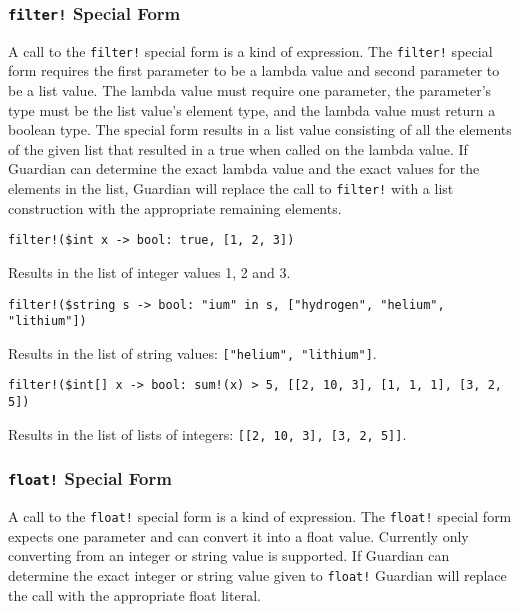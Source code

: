 {	\subsubsection{\texttt{filter!} Special Form}
	{
		A call to the \texttt{filter!} special form is a kind of expression.
		The \texttt{filter!} special form requires the first parameter to be
		a lambda value and second parameter to be a list value.
		The lambda value must require one parameter, the parameter's type must
		be the list value's element type, and the lambda value must return a
		boolean type.
		The special form results in a list value consisting of all the elements
		of the given list that resulted in a true when called on the lambda
		value.
		If Guardian can determine the exact lambda value and the exact
		values for the elements in the list, Guardian will replace the call
		to \texttt{filter!} with a list construction with the appropriate
		remaining elements.
		
		\begin{itemize}
		{
			\item[] \texttt{filter!(\$int x -> bool: true, [1, 2, 3])}
			
				Results in the list of integer values 1, 2 and 3.
			
			\item[] \texttt{filter!(\$string s -> bool: "ium" in s, ["hydrogen", "helium", "lithium"])}
			
				Results in the list of string
				values: \texttt{["helium", "lithium"]}.
			
			\item[] \texttt{filter!(\$int[] x -> bool: sum!(x) > 5, [[2, 10, 3], [1, 1, 1], [3, 2, 5])}
				
				Results in the list of lists of
				integers: \texttt{[[2, 10, 3], [3, 2, 5]]}.
		}
		\end{itemize}
	}
	
	\subsubsection{\texttt{float!} Special Form}
	{
		A call to the \texttt{float!} special form is a kind of expression.
		The \texttt{float!} special form expects one parameter and can convert it
		into a float value. Currently only converting from an integer or string
		value is supported.
		If Guardian can determine the exact integer or string value given to
		\texttt{float!} Guardian will replace the call with the appropriate
		float literal.
		
}}
